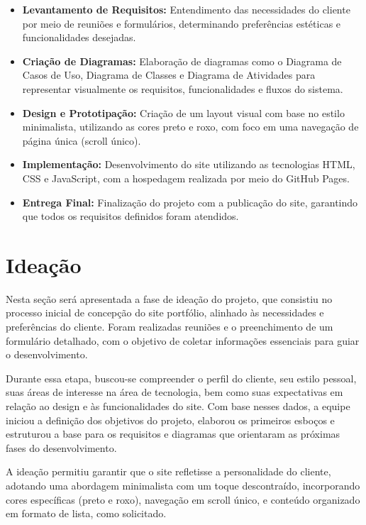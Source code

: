 \begin{itemize}
    \item \textbf{Levantamento de Requisitos:} Entendimento das necessidades do cliente por meio de reuniões e formulários, determinando preferências estéticas e funcionalidades desejadas.
    \item \textbf{Criação de Diagramas:} Elaboração de diagramas como o Diagrama de Casos de Uso, Diagrama de Classes e Diagrama de Atividades para representar visualmente os requisitos, funcionalidades e fluxos do sistema.
    \item \textbf{Design e Prototipação:} Criação de um layout visual com base no estilo minimalista, utilizando as cores preto e roxo, com foco em uma navegação de página única (scroll único).
    \item \textbf{Implementação:} Desenvolvimento do site utilizando as tecnologias HTML, CSS e JavaScript, com a hospedagem realizada por meio do GitHub Pages.
    \item \textbf{Entrega Final:} Finalização do projeto com a publicação do site, garantindo que todos os requisitos definidos foram atendidos.
\end{itemize}



\section{Ideação}

Nesta seção será apresentada a fase de ideação do projeto, que consistiu no processo inicial de concepção do site portfólio, alinhado às necessidades e preferências do cliente. Foram realizadas reuniões e o preenchimento de um formulário detalhado, com o objetivo de coletar informações essenciais para guiar o desenvolvimento.

Durante essa etapa, buscou-se compreender o perfil do cliente, seu estilo pessoal, suas áreas de interesse na área de tecnologia, bem como suas expectativas em relação ao design e às funcionalidades do site. Com base nesses dados, a equipe iniciou a definição dos objetivos do projeto, elaborou os primeiros esboços e estruturou a base para os requisitos e diagramas que orientaram as próximas fases do desenvolvimento.

A ideação permitiu garantir que o site refletisse a personalidade do cliente, adotando uma abordagem minimalista com um toque descontraído, incorporando cores específicas (preto e roxo), navegação em scroll único, e conteúdo organizado em formato de lista, como solicitado.


